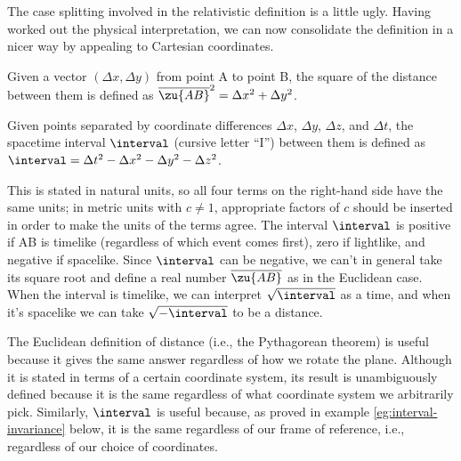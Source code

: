 The case splitting involved in the relativistic definition is a little ugly. Having worked out the physical
interpretation, we can now consolidate the definition in a nicer way by appealing to Cartesian coordinates.

\begin{lessimportant}
Given a vector $(\Delta x,\Delta y)$ from point A to point B, the square of the distance between them is defined as 
$\overline{\zu{AB}}^2=\Delta x^2+\Delta y^2$.
\end{lessimportant}

\begin{lessimportant}
Given points separated by coordinate differences $\Delta x$, $\Delta y$, $\Delta z$, and $\Delta t$,
the spacetime interval $\interval$ (cursive letter ``I'') between them
is defined as $\interval = \Delta t^2-\Delta x^2-\Delta y^2-\Delta z^2$.
\end{lessimportant}

This is stated in natural units, so all four terms on the right-hand side have the same units;
in metric units with $c \ne 1$, appropriate factors of $c$ should be inserted in order to make the units of
the terms agree.
The interval $\interval$ is positive if AB is timelike (regardless of which event comes first),
zero if lightlike, and negative if spacelike. Since $\interval$ can be negative, we can't in general take its
square root and define a real number $\overline{\zu{AB}}$ as in the Euclidean case. When the interval
is timelike, we can interpret $\sqrt{\interval}$ as a time, and when it's spacelike we can take
$\sqrt{-\interval}$ to be a distance.

The Euclidean
definition of distance (i.e., the Pythagorean theorem) is useful because it gives the same answer
regardless of how we rotate the plane. Although it is stated in terms of a certain coordinate system,
its result is unambiguously defined because it is
the same regardless of what coordinate system we arbitrarily pick. Similarly, $\interval$
is useful because, as proved in example \ref{eg:interval-invariance} below, it is the same regardless of our frame of reference, i.e., regardless of our choice
of coordinates.


